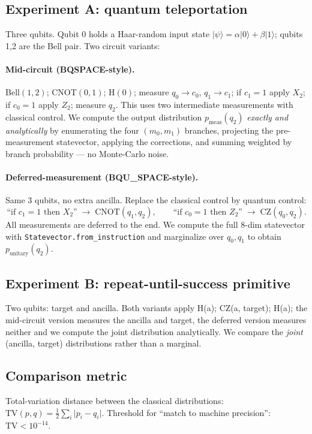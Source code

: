\documentclass[11pt]{article}
\begin{document}
\subsection{Experiment A: quantum teleportation}
Three qubits.  Qubit 0 holds a Haar-random input state $\lvert\psi\rangle = \alpha\lvert 0\rangle +
\beta\lvert 1\rangle$; qubits 1,2 are the Bell pair.  Two circuit variants:
\paragraph{Mid-circuit (BQSPACE-style).}  Bell$(1,2)$; CNOT$(0,1)$; H$(0)$; measure $q_0\to c_0$,
$q_1\to c_1$; if $c_1{=}1$ apply $X_2$; if $c_0{=}1$ apply $Z_2$; measure $q_2$.  This uses two
intermediate measurements with classical control.  We compute the output distribution
$p_{\mathrm{meas}}(q_2)$ \emph{exactly and analytically} by enumerating the four $(m_0,m_1)$ branches,
projecting the pre-measurement statevector, applying the corrections, and summing weighted by
branch probability --- no Monte-Carlo noise.

\paragraph{Deferred-measurement (BQU\_SPACE-style).}  Same 3 qubits, no extra ancilla.  Replace
the classical control by quantum control:
\[
  \text{``if } c_1{=}1 \text{ then } X_2\text{''} \;\longrightarrow\; \mathrm{CNOT}(q_1,q_2),\qquad
  \text{``if } c_0{=}1 \text{ then } Z_2\text{''} \;\longrightarrow\; \mathrm{CZ}(q_0,q_2).
\]
All measurements are deferred to the end.  We compute the full 8-dim statevector with
\texttt{Statevector.from\_instruction} and marginalize over $q_0,q_1$ to obtain
$p_{\mathrm{unitary}}(q_2)$.

\subsection{Experiment B: repeat-until-success primitive}
Two qubits: target and ancilla.  Both variants apply H(a); CZ(a, target); H(a); the mid-circuit
version measures the ancilla and target, the deferred version measures neither and we compute the
joint distribution analytically.  We compare the \emph{joint} (ancilla, target) distributions rather
than a marginal.

\subsection{Comparison metric}
Total-variation distance between the classical distributions:
$\mathrm{TV}(p,q) = \tfrac{1}{2}\sum_i \lvert p_i - q_i\rvert$.
Threshold for ``match to machine precision'': $\mathrm{TV} < 10^{-14}$.
\end{document}
